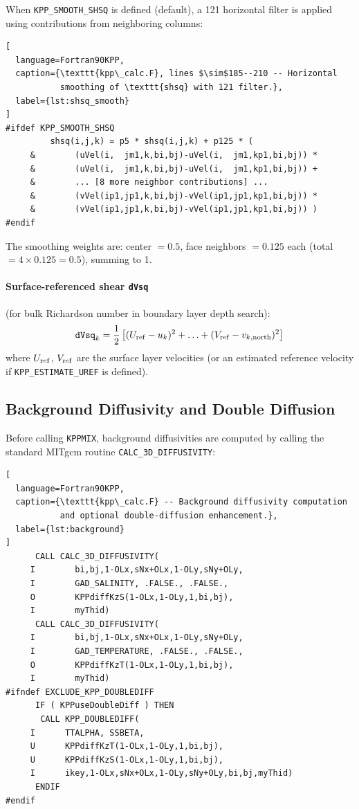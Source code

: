 \documentclass[12pt,letterpaper]{article}
\begin{document}
When \texttt{KPP\_SMOOTH\_SHSQ} is defined (default), a 121 horizontal  
filter is applied using contributions from neighboring columns:  
  
\begin{lstlisting}[  
  language=Fortran90KPP,  
  caption={\texttt{kpp\_calc.F}, lines $\sim$185--210 -- Horizontal  
           smoothing of \texttt{shsq} with 121 filter.},  
  label={lst:shsq_smooth}  
]  
#ifdef KPP_SMOOTH_SHSQ  
         shsq(i,j,k) = p5 * shsq(i,j,k) + p125 * (  
     &        (uVel(i,  jm1,k,bi,bj)-uVel(i,  jm1,kp1,bi,bj)) *  
     &        (uVel(i,  jm1,k,bi,bj)-uVel(i,  jm1,kp1,bi,bj)) +  
     &        ... [8 more neighbor contributions] ...  
     &        (vVel(ip1,jp1,k,bi,bj)-vVel(ip1,jp1,kp1,bi,bj)) *  
     &        (vVel(ip1,jp1,k,bi,bj)-vVel(ip1,jp1,kp1,bi,bj)) )  
#endif  
\end{lstlisting}  
  
The smoothing weights are: center $= 0.5$, face neighbors $= 0.125$  
each (total $= 4 \times 0.125 = 0.5$), summing to 1.  
  
\paragraph{Surface-referenced shear \texttt{dVsq}} (for bulk Richardson  
number in boundary layer depth search):  
\begin{equation}  
\texttt{dVsq}_{k} = \frac{1}{2}\left[  
  (U_{\rm ref} - u_k)^2 + \ldots + (V_{\rm ref} - v_{k,\rm north})^2  
\right]  
\end{equation}  
where $U_{\rm ref}$, $V_{\rm ref}$ are the surface layer velocities  
(or an estimated reference velocity if \texttt{KPP\_ESTIMATE\_UREF} is  
defined).  
  
\subsection{Background Diffusivity and Double Diffusion}  
  
Before calling \texttt{KPPMIX}, background diffusivities are computed  
by calling the standard MITgcm routine \texttt{CALC\_3D\_DIFFUSIVITY}:  
  
\begin{lstlisting}[  
  language=Fortran90KPP,  
  caption={\texttt{kpp\_calc.F} -- Background diffusivity computation  
           and optional double-diffusion enhancement.},  
  label={lst:background}  
]  
      CALL CALC_3D_DIFFUSIVITY(  
     I        bi,bj,1-OLx,sNx+OLx,1-OLy,sNy+OLy,  
     I        GAD_SALINITY, .FALSE., .FALSE.,  
     O        KPPdiffKzS(1-OLx,1-OLy,1,bi,bj),  
     I        myThid)  
      CALL CALC_3D_DIFFUSIVITY(  
     I        bi,bj,1-OLx,sNx+OLx,1-OLy,sNy+OLy,  
     I        GAD_TEMPERATURE, .FALSE., .FALSE.,  
     O        KPPdiffKzT(1-OLx,1-OLy,1,bi,bj),  
     I        myThid)  
#ifndef EXCLUDE_KPP_DOUBLEDIFF  
      IF ( KPPuseDoubleDiff ) THEN  
       CALL KPP_DOUBLEDIFF(  
     I      TTALPHA, SSBETA,  
     U      KPPdiffKzT(1-OLx,1-OLy,1,bi,bj),  
     U      KPPdiffKzS(1-OLx,1-OLy,1,bi,bj),  
     I      ikey,1-OLx,sNx+OLx,1-OLy,sNy+OLy,bi,bj,myThid)  
      ENDIF  
#endif  
\end{lstlisting}  
  
\end{document}
